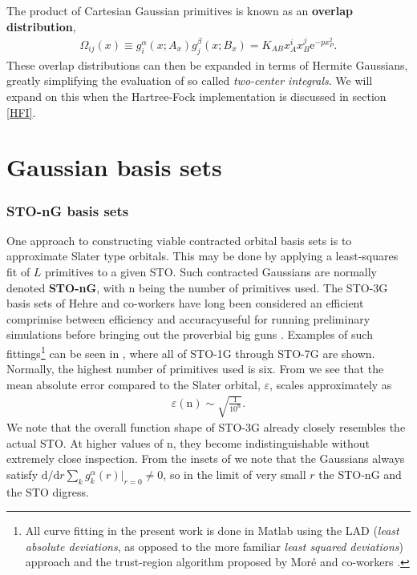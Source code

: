 \documentclass[../../master.tex]{subfiles}
\begin{document}
The product of Cartesian Gaussian primitives is known as an {\bf overlap distribution}, \cite{integrals}
\begin{align}
\Omega_{ij}(x)\equiv g_i^\alpha(x;A_x)g_j^\beta(x;B_x)= K_{AB}x_A^ix_B^j \mathrm{e}^{-px_P^2}.
\end{align}
These overlap distributions can then be expanded in terms of Hermite Gaussians, greatly simplifying the evaluation of so called \emph{two-center integrals}. We will expand on this when the Hartree-Fock implementation is discussed in section \ref{HFI}.

\section{Gaussian basis sets}
\subsubsection{STO-nG basis sets}
One approach to constructing viable contracted orbital basis sets is to approximate Slater type orbitals. This may be done by applying a least-squares fit of $L$ primitives to a given STO. Such contracted Gaussians are normally denoted {\bf STO-nG}, with n being the number of primitives used. The STO-3G basis sets of Hehre and co-workers have long been considered an efficient comprimise between efficiency and accuracy\textemdash useful for running preliminary simulations before bringing out the proverbial big guns \cite{hehre,cramer,taylor}. Examples of such fittings\footnote{All curve fitting in the present work is done in {\sc Matlab} using the LAD (\emph{least absolute deviations}, as opposed to the more familiar \emph{least squared deviations}) approach and the trust-region algorithm proposed by Moré and co-workers \cite{charnes1955optimal,koenker1978regression,more1983computing}.} can be seen in , where all of STO-1G through STO-7G are shown. Normally, the highest number of primitives used is six. From  we see that the mean absolute error compared to the Slater orbital, $\varepsilon$, scales approximately as 
\begin{align}
\varepsilon(\text{n})\sim \sqrt{\frac{1}{10^\text{n}}}.
\end{align}
We note that the overall function shape of STO-3G already closely resembles the actual STO. At higher values of n, they become indistinguishable without extremely close inspection. From the insets of  we note that the Gaussians always satisfy $\mathrm{d}/\mathrm{d}r \sum_k g_k^\alpha(r)\big|_{r=0}\not=0$, so in the limit of very small $r$ the STO-nG and the STO digress. 
\end{document}
